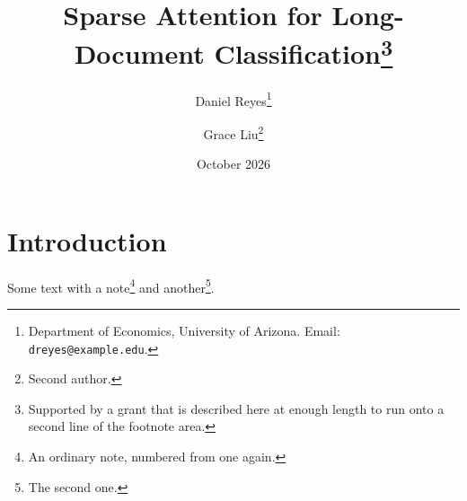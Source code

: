 \documentclass{article}
\title{Sparse Attention for Long-Document Classification\thanks{Supported by a grant that is described here at enough length to run onto a second line of the footnote area.}}
\author{Daniel Reyes\thanks{Department of Economics, University of Arizona. Email:
\texttt{dreyes@example.edu}.} \and Grace Liu\footnote{Second author.}}
\date{October 2026}
\begin{document}
\maketitle
\section{Introduction}
Some text with a note\footnote{An ordinary note, numbered from one again.} and another\footnote{The second one.}.
\end{document}
